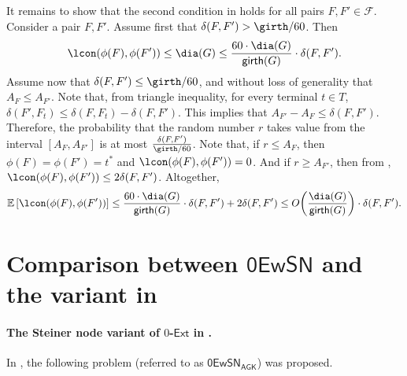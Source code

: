 \documentclass[11pt]{article}
\theoremstyle{definition}
\newcommand{\fset}{{\mathcal{F}}}
\newcommand{\gir}{\textnormal{\textsf{girth}}}
\def\ex#1{{\mathbb{E}}\left[ #1 \right]}
\newcommand{\zesn}{\mathsf{0EwSN}}
\newcommand{\ze}{$0$-$\textsf{Ext}$\xspace}
\begin{document}
It remains to show that the second condition in  holds for all pairs $F,F'\in \fset$. Consider a pair $F,F'$.
Assume first that $\delta(F,F')>\girth/60$. Then $$\lcon(\phi(F),\phi(F')) \le \dia(G) \le \frac{60 \cdot \dia(G)}{\gir(G)}\cdot \delta(F,F').$$ 
Assume now that $\delta(F,F') \le \girth/60$, and without loss of generality that $A_{F} \le A_{F'}$. 
Note that, from triangle inequality, for every terminal $t\in T$, $\delta(F',F_t)\le \delta(F,F_t)-\delta(F,F')$. This implies that $A_{F'}-A_{F} \le \delta(F,F')$. Therefore, the probability that the random number $r$ takes value from the interval $[A_{F}, A_{F'}]$ is at most $\frac{\delta(F,F')}{\girth/60}$. %
Note that, if $r\le A_{F}$, then $\phi(F)=\phi(F')=t^*$ and $\lcon(\phi(F),\phi(F'))=0$.
And  if $r\ge A_{F'}$, then from , $\lcon(\phi(F),\phi(F')) \le 2\delta(F,F')$. Altogether,
$$\ex{\lcon(\phi(F),\phi(F'))} \le \frac{60\cdot \dia(G)}{\gir(G)} \cdot\delta(F,F') + 2 \delta(F,F') \le O\bigg(\frac{\dia(G)}{\gir(G)}\bigg)\cdot \delta(F,F').$$




%

\appendix
\section{Comparison between $\zesn$ and the variant in \cite{andoni2014towards}}
\label{sec: compare}

\paragraph{The Steiner node variant of \ze in \cite{andoni2014towards}.}
In \cite{andoni2014towards}, the following problem (referred to as $\zesn_{\textsf{AGK}}$) was proposed.
\end{document}
